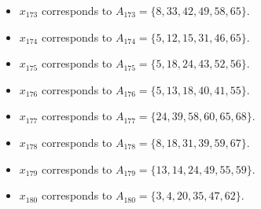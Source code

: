 \documentclass[11pt]{article}
\begin{document}
\begin{itemize}
\item $x_{173}$ corresponds to $A_{173}=\{8, 33, 42, 49, 58, 65\}$.
\item $x_{174}$ corresponds to $A_{174}=\{5, 12, 15, 31, 46, 65\}$.
\item $x_{175}$ corresponds to $A_{175}=\{5, 18, 24, 43, 52, 56\}$.
\item $x_{176}$ corresponds to $A_{176}=\{5, 13, 18, 40, 41, 55\}$.
\item $x_{177}$ corresponds to $A_{177}=\{24, 39, 58, 60, 65, 68\}$.
\item $x_{178}$ corresponds to $A_{178}=\{8, 18, 31, 39, 59, 67\}$.
\item $x_{179}$ corresponds to $A_{179}=\{13, 14, 24, 49, 55, 59\}$.
\item $x_{180}$ corresponds to $A_{180}=\{3, 4, 20, 35, 47, 62\}$.
\end{itemize}
\end{document}
